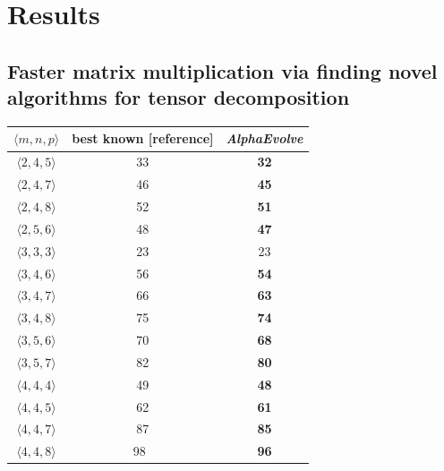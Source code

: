 \documentclass[logo,copyright,12pt]{googledeepmind}
\theoremstyle{definition}
\theoremstyle{remark}
\theoremstyle{plain}
\newcommand{\method}{\emph{AlphaEvolve}\xspace}
\begin{document}



\section{Results}
\label{sec:results}

\subsection{Faster matrix multiplication via finding novel algorithms for tensor decomposition}
\label{subsec:matmul}

\begin{table}[t]
\begin{center}
    \begin{tabular}{ccc}
    $\langle m, n, p \rangle$ & best known [reference] & \method \\ \midrule
    $\langle 2, 4, 5 \rangle$ & 33 \citep{hopcroft} & \textbf{32} \\
    $\langle 2, 4, 7 \rangle$ & 46 \citep{smirnov2013bilinear} & \textbf{45} \\
    $\langle 2, 4, 8 \rangle$ & 52 \citep{smirnov2013bilinear} & \textbf{51} \\
    $\langle 2, 5, 6 \rangle$ & 48 \citep{smirnov2013bilinear}   & \textbf{47}    \\ 
    $\langle 3, 3, 3 \rangle$ & 23 \citep{laderman}   & 23   \\
    $\langle 3, 4, 6 \rangle$ & 56 \citep{Kauers_2025}   & \textbf{54}   \\ 
    $\langle 3, 4, 7 \rangle$ & 66 \citep{smirnov2021}   & \textbf{63}   \\ 
    $\langle 3, 4, 8 \rangle$ & 75 \citep{smirnov2021}   & \textbf{74}    \\ 
    $\langle 3, 5, 6 \rangle$ & 70 \citep{Kauers_2025}   & \textbf{68}    \\
    $\langle 3, 5, 7 \rangle$ & 82 \citep{smirnov2021}   & \textbf{80}    \\ 
    $\langle 4, 4, 4 \rangle$ & 49 \citep{strassen1969gaussian}   & \textbf{48}  \\ 
    $\langle 4, 4, 5 \rangle$ & 62 \citep{kauers2023flip}   & \textbf{61}    \\
    $\langle 4, 4, 7 \rangle$ & 87 \citep{smirnov2013bilinear} & \textbf{85}    \\
    $\langle 4, 4, 8 \rangle$ & 98~\citep{strassen1969gaussian} & {\textbf{96}} \\ 

\end{tabular}
\end{center}
\end{table}
\end{document}
